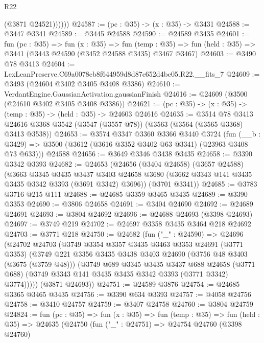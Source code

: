 \begin{lexlean}{R22}
\begin{coremodule}
              (@3871 @24521))))))
@24587 := (pc : @35) -> (x : @35) -> @3431
@24588 := @3447 @3341
@24589 := @3445 @24588
@24590 := @24589 @3435
@24601 := fun (pc : @35) =>
  fun (x : @35) =>
  fun (temp : @35) => fun (held : @35) => @3441 (@3443 @24590 (@3452 @24588 @3435) @3467 @3467)
@24603 := @3490 @78 @3413
@24604 := LexLeanPreserve.C69a0078cb8f644959d8d87c652d4be05.R22.__fits_7
@24609 := @3493 (@24604 @3402 @3405 @3408 @3386)
@24610 := VerdantEngine.GaussianActivation.gaussianFinish
@24616 := @24609 (@3500 (@24610 @3402 @3405 @3408 @3386))
@24621 := (pc : @35) -> (x : @35) -> (temp : @35) -> (held : @35) -> @24603 @24616
@24635 := @3514
    @78
    @3413
    @24616
    @3368
    @3542
    (@3547 (@3557 @78))
    (@3563 (@3564 (@3565 @3368) @3413 @3538))
@24653 := @3574
    @3347
    @3360
    @3366
    @3440
    @3724
    (fun (__b : @3429) => @3500 (@3612 (@3616 @3352 @3402 @63 @3341) (@23963 @3408 @73 @633)))
    @24588
@24656 := @3649 @3346 @3438 @3435
@24658 := @3390 @3342 @3393
@24682 := @24653
    (@24656
      (@3404 @24658)
      (@3657 @24588)
      (@3663
        @3345
        @3435
        @3437
        @3403
        @24658
        @3680
        (@3662 @3343 @141 @3435 @3435 @3342 @3393 (@3691 @3342) @3696))
      (@3701 @3341))
@24685 := @3783 @3716 @215 @111
@24688 := @24685 @3359 @3465 @3435
@24689 := @3390 @3353
@24690 := @3806 @24658
@24691 := @3404 @24690
@24692 := @24689 @24691
@24693 := @3804 @24692
@24696 := @24688 @24693 (@3398 @24693)
@24697 := @3749 @219
@24702 := @24697 @3358 @3435 @3464 @218 @24692
@24703 := @3771 @218
@24750 := @24682
    (fun ("_" : @24590) =>
    @24696
      (@24702
        @24703
        (@3749
          @3354
          @3357
          @3435
          @3463
          @3353
          @24691
          (@3771 @3353)
          (@3749
            @221
            @3356
            @3435
            @3438
            @3403
            @24690
            (@3756 @48 @3403 (@3675 (@3759 @48)))
            (@3749
              @689
              @3345
              @3435
              @3437
              @688
              @24658
              (@3771 @688)
              (@3749 @3343 @141 @3435 @3435 @3342 @3393 (@3771 @3342) @3774)))))
      (@3871 @24693))
@24751 := @24589 @3876
@24754 := @24685 @3365 @3465 @3435
@24756 := @3390 @634 @3393
@24757 := @4058 @24756
@24758 := @3410 @24757
@24759 := @3407 @24758
@24760 := @3804 @24759
@24824 := fun (pc : @35) =>
  fun (x : @35) =>
  fun (temp : @35) =>
  fun (held : @35) =>
  @24635
    (@24750
      (fun ("_" : @24751) =>
      @24754
        @24760
        (@3398 @24760)

\end{coremodule}
\end{lexlean}
